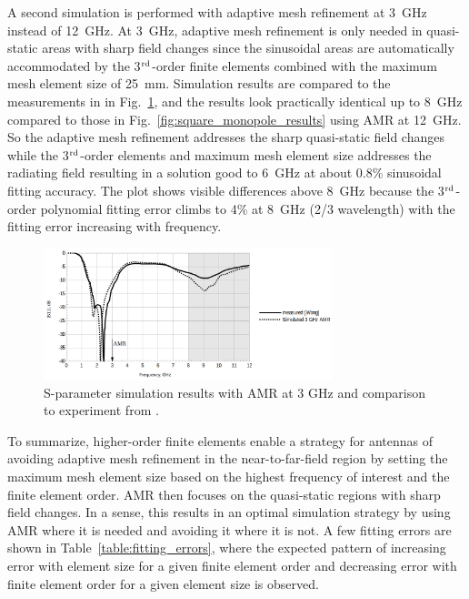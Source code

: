 \documentclass[titlepage]{article}
\renewcommand\_{\textunderscore\linebreak[1]}
\begin{document}
A second simulation is performed with adaptive mesh refinement at 3~GHz instead of 12~GHz.  At 3~GHz, adaptive mesh refinement is only needed in quasi-static areas with sharp field changes since the sinusoidal areas are automatically accommodated by the 3$^{\textnormal{rd}}$-order finite elements combined with the maximum mesh element size of 25~mm.  Simulation results are compared to the measurements in \cite{Wong} in Fig.~\ref{fig:square_monopole_results_3GHz}, and the results look practically identical up to 8~GHz compared to those in Fig.~\ref{fig:square_monopole_results} using AMR at 12~GHz.  So the adaptive mesh refinement addresses the sharp quasi-static field changes while the 3$^{\textnormal{rd}}$-order elements and maximum mesh element size addresses the radiating field resulting in a solution good to 6~GHz at about 0.8\% sinusoidal fitting accuracy.  The plot shows visible differences above 8~GHz because the 3$^{\textnormal{rd}}$-order polynomial fitting error climbs to 4\% at 8~GHz (2/3 wavelength) with the fitting error increasing with frequency.
\begin{figure}[H]
  \centering
  \includegraphics[width=0.75\textwidth]{../regression/OpenParEM3D/antenna/square_monopole_study/screenshots/results_3GHz_AMR}
  \caption{S-parameter simulation results with AMR at 3 GHz and comparison to experiment from \cite{Wong}.}
  \label{fig:square_monopole_results_3GHz}
\end{figure}

To summarize, higher-order finite elements enable a strategy for antennas of avoiding adaptive mesh refinement in the near-to-far-field region by setting the maximum mesh element size based on the highest frequency of interest and the finite element order.  AMR then focuses on the quasi-static regions with sharp field changes.  In a sense, this results in an optimal simulation strategy by using AMR where it is needed and avoiding it where it is not.  A few fitting errors are shown in Table~\ref{table:fitting_errors}, where the expected pattern of increasing error with element size for a given finite element order and decreasing error with finite element order for a given element size is observed.
\end{document}
